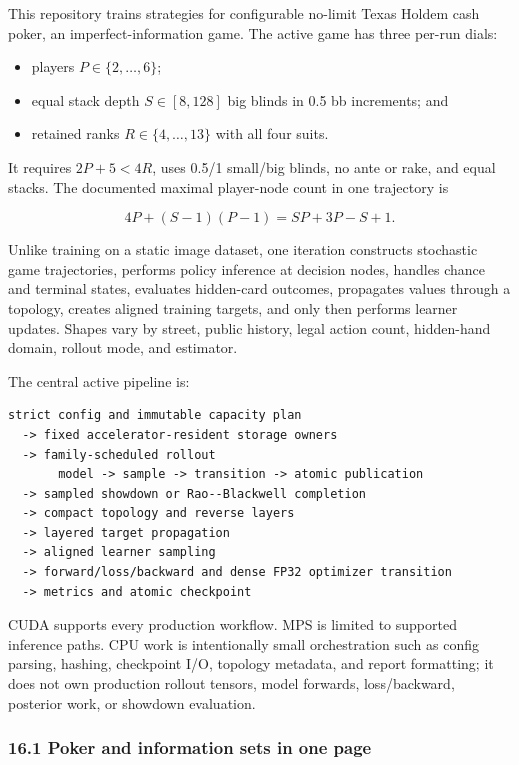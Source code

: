\documentclass[
  10pt,
  letterpaper,
]{article}
\providecommand{\tightlist}{%
  \setlength{\itemsep}{0pt}\setlength{\parskip}{0pt}}
\begin{document}
This repository trains strategies for configurable no-limit Texas
Hold\textquotesingle em cash poker, an imperfect-information game. The
active game has three per-run dials:

\begin{itemize}
\tightlist
\item
  players \(P\in\{2,\ldots,6\}\);
\item
  equal stack depth \(S\in[8,128]\) big blinds in 0.5 bb increments; and
\item
  retained ranks \(R\in\{4,\ldots,13\}\) with all four suits.
\end{itemize}

It requires \(2P+5<4R\), uses 0.5/1 small/big blinds, no ante or rake,
and equal stacks. The documented maximal player-node count in one
trajectory is

\[
4P+(S-1)(P-1)=SP+3P-S+1.
\]

Unlike training on a static image dataset, one iteration constructs
stochastic game trajectories, performs policy inference at decision
nodes, handles chance and terminal states, evaluates hidden-card
outcomes, propagates values through a topology, creates aligned training
targets, and only then performs learner updates. Shapes vary by street,
public history, legal action count, hidden-hand domain, rollout mode,
and estimator.

The central active pipeline is:

\begin{verbatim}
strict config and immutable capacity plan
  -> fixed accelerator-resident storage owners
  -> family-scheduled rollout
       model -> sample -> transition -> atomic publication
  -> sampled showdown or Rao--Blackwell completion
  -> compact topology and reverse layers
  -> layered target propagation
  -> aligned learner sampling
  -> forward/loss/backward and dense FP32 optimizer transition
  -> metrics and atomic checkpoint
\end{verbatim}

CUDA supports every production workflow. MPS is limited to supported
inference paths. CPU work is intentionally small orchestration such as
config parsing, hashing, checkpoint I/O, topology metadata, and report
formatting; it does not own production rollout tensors, model forwards,
loss/backward, posterior work, or showdown evaluation.

\subsubsection{16.1 Poker and information sets in one
page}\label{161-poker-and-information-sets-in-one-page}
\end{document}
